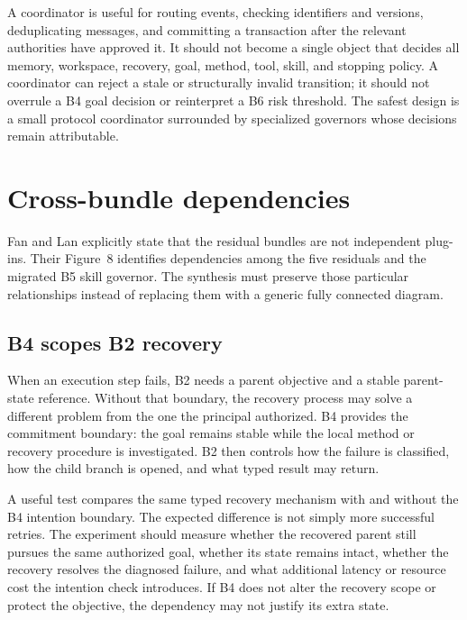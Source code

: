 A coordinator is useful for routing events, checking identifiers and versions, deduplicating messages, and committing a transaction after the relevant authorities have approved it. It should not become a single object that decides all memory, workspace, recovery, goal, method, tool, skill, and stopping policy. A coordinator can reject a stale or structurally invalid transition; it should not overrule a B4 goal decision or reinterpret a B6 risk threshold. The safest design is a small protocol coordinator surrounded by specialized governors whose decisions remain attributable.


\section{Cross-bundle dependencies}
\label{sec:ch18-cross-bundle-dependencies}

Fan and Lan explicitly state that the residual bundles are not independent plug-ins. Their Figure~8 identifies dependencies among the five residuals and the migrated B5 skill governor. The synthesis must preserve those particular relationships instead of replacing them with a generic fully connected diagram.

\subsection{B4 scopes B2 recovery}
\label{subsec:ch18-b4-scopes-b2}

When an execution step fails, B2 needs a parent objective and a stable parent-state reference. Without that boundary, the recovery process may solve a different problem from the one the principal authorized. B4 provides the commitment boundary: the goal remains stable while the local method or recovery procedure is investigated. B2 then controls how the failure is classified, how the child branch is opened, and what typed result may return.

A useful test compares the same typed recovery mechanism with and without the B4 intention boundary. The expected difference is not simply more successful retries. The experiment should measure whether the recovered parent still pursues the same authorized goal, whether its state remains intact, whether the recovery resolves the diagnosed failure, and what additional latency or resource cost the intention check introduces. If B4 does not alter the recovery scope or protect the objective, the dependency may not justify its extra state.

